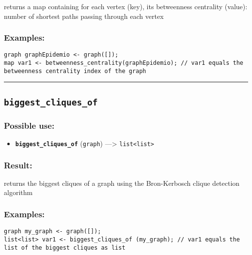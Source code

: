 \documentclass[]{book}
\providecommand{\tightlist}{%
  \setlength{\itemsep}{0pt}\setlength{\parskip}{0pt}}
\theoremstyle{definition}
\theoremstyle{definition}
\theoremstyle{definition}
\theoremstyle{remark}
\begin{document}
returns a map containing for each vertex (key), its betweenness
centrality (value): number of shortest paths passing through each vertex

\subsubsection{Examples:}\label{examples-54}

\begin{verbatim}
graph graphEpidemio <- graph([]);  
map var1 <- betweenness_centrality(graphEpidemio); // var1 equals the betweenness centrality index of the graph
\end{verbatim}

\begin{center}\rule{0.5\linewidth}{\linethickness}\end{center}

\subsection{\texorpdfstring{\texttt{biggest\_cliques\_of}}{biggest\_cliques\_of}}\label{biggest_cliques_of}

\subsubsection{Possible use:}\label{possible-use-69}

\begin{itemize}
\tightlist
\item
  \textbf{\texttt{biggest\_cliques\_of}} (\texttt{graph})
  ---\textgreater{} \texttt{list\textless{}list\textgreater{}}
\end{itemize}

\subsubsection{Result:}\label{result-68}

returns the biggest cliques of a graph using the Bron-Kerbosch clique
detection algorithm

\subsubsection{Examples:}\label{examples-55}

\begin{verbatim}
graph my_graph <- graph([]);  
list<list> var1 <- biggest_cliques_of (my_graph); // var1 equals the list of the biggest cliques as list
\end{verbatim}
\end{document}
